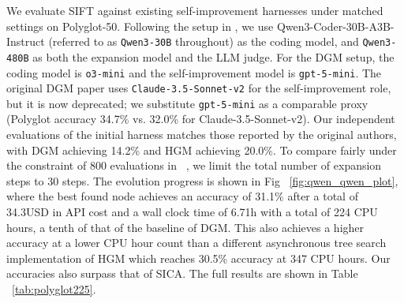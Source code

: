 \documentclass{article}
\begin{document}
We evaluate SIFT against existing self-improvement harnesses under matched settings on Polyglot-50. 
Following the setup in \citet{hgm}, we use Qwen3-Coder-30B-A3B-Instruct \citep{qwen3technicalreport} (referred to as \texttt{Qwen3-30B} throughout) as the coding model, and \texttt{Qwen3-480B} as both the expansion model and the LLM judge. 
For the DGM setup, the coding model is \texttt{o3-mini} and the self-improvement model is \texttt{gpt-5-mini}. The original DGM paper uses \texttt{Claude-3.5-Sonnet-v2} for the self-improvement role, but it is now deprecated; we substitute \texttt{gpt-5-mini} as a comparable proxy (Polyglot accuracy 34.7\% vs. 32.0\% for Claude-3.5-Sonnet-v2). 
Our independent evaluations of the initial harness matches those reported by the original authors, with DGM achieving 14.2\% and HGM achieving 20.0\%.
To compare fairly under the constraint of 800 evaluations in ~\cite{hgm}, we limit the total number of expansion steps to 30 steps. The evolution progress is shown in Fig ~\ref{fig:qwen_qwen_plot}, where the best found node achieves an accuracy of 31.1\% after a total of 34.3USD in API cost and a wall clock time of 6.71h with a total of 224 CPU hours, a tenth of that of the baseline of DGM. This also achieves a higher accuracy at a lower CPU hour count than a different asynchronous tree search implementation of HGM which reaches 30.5\% accuracy at 347 CPU hours. Our accuracies also surpass that of SICA. The full results are shown in Table ~\ref{tab:polyglot225}.
\end{document}
